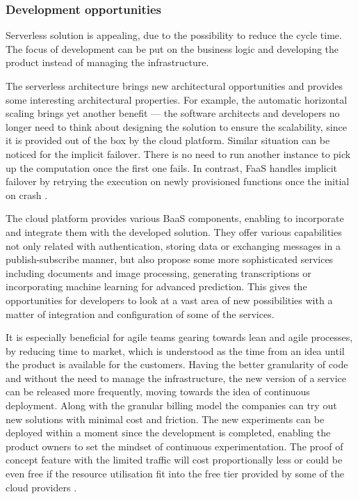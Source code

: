 \subsubsection{Development opportunities} \label{chapter:serverless-development-opportunities}

Serverless solution is appealing, due to the possibility to reduce the cycle time. The focus of development can be put on the business logic and developing the product instead of managing the infrastructure.

The serverless architecture brings new architectural opportunities and provides some interesting architectural properties. For example, the automatic horizontal scaling brings yet another benefit --- the software architects and developers no longer need to think about designing the solution to ensure the scalability, since it is provided out of the box by the cloud platform. Similar situation can be noticed for the implicit failover. There is no need to run another instance to pick up the computation once the first one fails. In contrast, FaaS handles implicit failover by retrying the execution on newly provisioned functions once the initial on crash \cite{LeveragingServerlessCloudComputingArchitectures}.

The cloud platform provides various BaaS components, enabling to incorporate and integrate them with the developed solution. They offer various capabilities not only related with authentication, storing data or exchanging messages in a publish-subscribe manner, but also propose some more sophisticated services including documents and image processing, generating transcriptions or incorporating machine learning for advanced prediction. This gives the opportunities for developers to look at a vast area of new possibilities with a matter of integration and configuration of some of the services.

It is especially beneficial for agile teams gearing towards lean and agile processes, by reducing time to market, which is understood as the time from an idea until the product is available for the customers. Having the better granularity of code and without the need to manage the infrastructure, the new version of a service can be released more frequently, moving towards the idea of continuous deployment. Along with the granular billing model the companies can try out new solutions with minimal cost and friction. The new experiments can be deployed within a moment since the development is completed, enabling the product owners to set the mindset of continuous experimentation. The proof of concept feature with the limited traffic will cost proportionally less or could be even free if the resource utilisation fit into the free tier provided by some of the cloud providers \cite{MartinFowlerServerless}.

